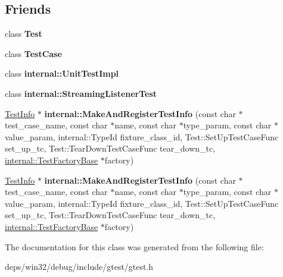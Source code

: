 \subsection*{Friends}
\begin{DoxyCompactItemize}
\item 
\hypertarget{classtesting_1_1_test_info_ab085d1bf4cff8b1045750706b11f8662}{}class {\bfseries Test}\label{classtesting_1_1_test_info_ab085d1bf4cff8b1045750706b11f8662}

\item 
\hypertarget{classtesting_1_1_test_info_a61fe0349d692eb6d4f5b94e35049b2e9}{}class {\bfseries Test\+Case}\label{classtesting_1_1_test_info_a61fe0349d692eb6d4f5b94e35049b2e9}

\item 
\hypertarget{classtesting_1_1_test_info_aa684cc13a8f91b00c0c9ce41ec7474eb}{}class {\bfseries internal\+::\+Unit\+Test\+Impl}\label{classtesting_1_1_test_info_aa684cc13a8f91b00c0c9ce41ec7474eb}

\item 
\hypertarget{classtesting_1_1_test_info_a2021083660b7387a257fb6c6242fee73}{}class {\bfseries internal\+::\+Streaming\+Listener\+Test}\label{classtesting_1_1_test_info_a2021083660b7387a257fb6c6242fee73}

\item 
\hypertarget{classtesting_1_1_test_info_a3e27fa5e97044d379b1e3b2a753f56f8}{}\hyperlink{classtesting_1_1_test_info}{Test\+Info} $\ast$ {\bfseries internal\+::\+Make\+And\+Register\+Test\+Info} (const char $\ast$test\+\_\+case\+\_\+name, const char $\ast$name, const char $\ast$type\+\_\+param, const char $\ast$value\+\_\+param, internal\+::\+Type\+Id fixture\+\_\+class\+\_\+id, Test\+::\+Set\+Up\+Test\+Case\+Func set\+\_\+up\+\_\+tc, Test\+::\+Tear\+Down\+Test\+Case\+Func tear\+\_\+down\+\_\+tc, \hyperlink{classtesting_1_1internal_1_1_test_factory_base}{internal\+::\+Test\+Factory\+Base} $\ast$factory)\label{classtesting_1_1_test_info_a3e27fa5e97044d379b1e3b2a753f56f8}

\item 
\hypertarget{classtesting_1_1_test_info_a3e27fa5e97044d379b1e3b2a753f56f8}{}\hyperlink{classtesting_1_1_test_info}{Test\+Info} $\ast$ {\bfseries internal\+::\+Make\+And\+Register\+Test\+Info} (const char $\ast$test\+\_\+case\+\_\+name, const char $\ast$name, const char $\ast$type\+\_\+param, const char $\ast$value\+\_\+param, internal\+::\+Type\+Id fixture\+\_\+class\+\_\+id, Test\+::\+Set\+Up\+Test\+Case\+Func set\+\_\+up\+\_\+tc, Test\+::\+Tear\+Down\+Test\+Case\+Func tear\+\_\+down\+\_\+tc, \hyperlink{classtesting_1_1internal_1_1_test_factory_base}{internal\+::\+Test\+Factory\+Base} $\ast$factory)\label{classtesting_1_1_test_info_a3e27fa5e97044d379b1e3b2a753f56f8}

\end{DoxyCompactItemize}


The documentation for this class was generated from the following file\+:\begin{DoxyCompactItemize}
\item 
deps/win32/debug/include/gtest/gtest.\+h\end{DoxyCompactItemize}
